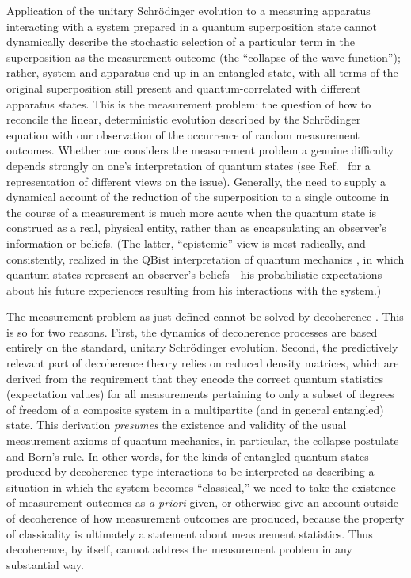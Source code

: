 \documentclass[3p,sort&compress,12pt]{elsarticle}
\begin{document}
Application of the unitary Schr\"odinger evolution to a measuring apparatus interacting with a system prepared in a quantum superposition state cannot dynamically describe the stochastic selection of a particular term in the superposition as the measurement outcome (the ``collapse of the wave function''); rather, system and apparatus end up in an entangled state, with all terms of the original superposition still present and quantum-correlated with different apparatus states. This is the measurement problem: the question of how to reconcile the linear, deterministic evolution described by the Schr\"odinger equation with our observation of the occurrence of random measurement outcomes. Whether one considers the measurement problem a genuine difficulty depends strongly on one's interpretation of quantum states (see Ref.~\cite{Schlosshauer:2011:ee} for a representation of different views on the issue). Generally, the need to supply a dynamical account of the reduction of the superposition to a single outcome in the course of a measurement is much more acute when the quantum state is construed as a real, physical entity, rather than as encapsulating an observer's information or beliefs. (The latter, ``epistemic'' view is most radically, and consistently, realized in the QBist interpretation of quantum mechanics \cite{Fuchs:2014:pp}, in which quantum states represent an observer's beliefs---his probabilistic expectations---about his future experiences resulting from his interactions with the system.)

The measurement problem as just defined cannot be solved by decoherence \cite{Schlosshauer:2003:tv,Schlosshauer:2007:un}.  This is so for two reasons. First, the dynamics of decoherence processes are based entirely on the standard, unitary Schr\"odinger evolution. Second, the predictively relevant part of decoherence theory relies on reduced density matrices, which are derived from the requirement that they encode the correct quantum statistics (expectation values) for all measurements pertaining to only a subset of degrees of freedom of a composite system in a multipartite (and in general entangled) state. This derivation \emph{presumes} the existence and validity of the usual measurement axioms of quantum mechanics, in particular, the collapse postulate and Born's rule. In other words, for the kinds of entangled quantum states produced by decoherence-type interactions to be interpreted as describing a situation in which the system becomes ``classical,'' we need to take the existence of measurement outcomes as \emph{a priori} given, or otherwise give an account outside of decoherence of how measurement outcomes are produced, because the property of classicality is ultimately a statement about measurement statistics. Thus decoherence, by itself, cannot address the measurement problem in any substantial way.
\end{document}
